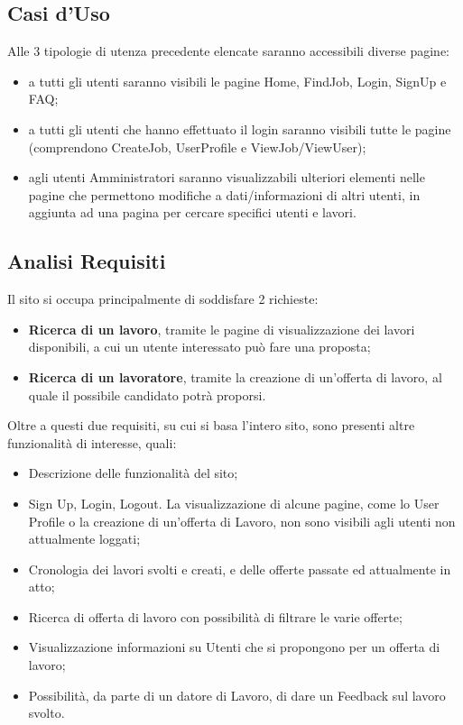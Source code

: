   \subsection{Casi d'Uso}
    Alle 3 tipologie di utenza precedente elencate saranno accessibili diverse pagine:
    \begin{itemize}
      \item a tutti gli utenti saranno visibili le pagine Home, FindJob, Login, SignUp e FAQ;
      \item a tutti gli utenti che hanno effettuato il login saranno visibili tutte le pagine (comprendono CreateJob, UserProfile e ViewJob/ViewUser);
      \item agli utenti Amministratori saranno visualizzabili ulteriori elementi nelle pagine che permettono modifiche a dati/informazioni di altri utenti, in aggiunta ad una pagina per cercare specifici utenti e lavori.
    \end{itemize}

  \subsection{Analisi Requisiti} 
    Il sito si occupa principalmente di soddisfare 2 richieste:
    \begin{itemize}
      \item \textbf{Ricerca di un lavoro}, tramite le pagine di visualizzazione dei lavori disponibili, a cui un utente interessato può fare una proposta;
      \item \textbf{Ricerca di un lavoratore}, tramite la creazione di un’offerta di lavoro, al quale il possibile candidato potrà proporsi.
    \end{itemize}
    Oltre a questi due requisiti, su cui si basa l’intero sito, sono presenti altre funzionalità di interesse, quali:
    \begin{itemize}
      \item Descrizione delle funzionalità del sito;
      \item Sign Up, Login, Logout. La visualizzazione di alcune pagine, come lo User Profile o la creazione di un'offerta di Lavoro, non sono visibili agli utenti non 
      attualmente loggati;
      \item Cronologia dei lavori svolti e creati, e delle offerte passate ed attualmente in atto;
      \item Ricerca di offerta di lavoro con possibilità di filtrare le varie offerte;
      \item Visualizzazione informazioni su Utenti che si propongono per un offerta di lavoro;
      \item Possibilità, da parte di un datore di Lavoro, di dare un Feedback sul lavoro svolto.
    \end{itemize}

